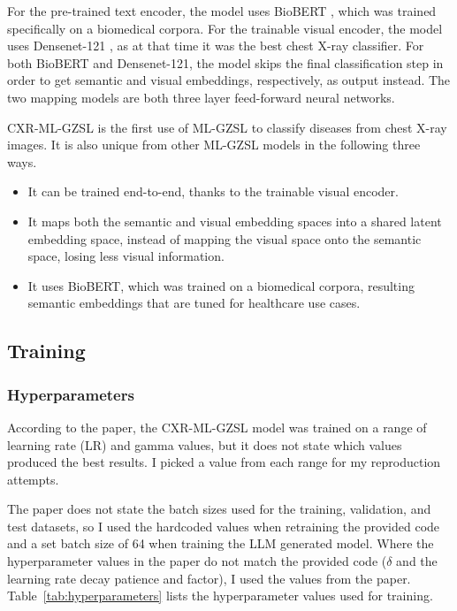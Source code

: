 \documentclass[letterpaper]{article} %
\begin{document}
For the pre-trained text encoder, the model uses BioBERT \cite{10.1093/bioinformatics/btz682}, which was trained specifically on a biomedical corpora. For the trainable visual encoder, the model uses Densenet-121 \cite{rajpurkar2017chexnetradiologistlevelpneumoniadetection}, as at that time it was the best chest X-ray classifier. For both BioBERT and Densenet-121, the model skips the final classification step in order to get semantic and visual embeddings, respectively, as output instead. The two mapping models are both three layer feed-forward neural networks.

CXR-ML-GZSL is the first use of ML-GZSL to classify diseases from chest X-ray images. It is also unique from other ML-GZSL models in the following three ways.

\begin{itemize}
    \item It can be trained end-to-end, thanks to the trainable visual encoder.
    \item It maps both the semantic and visual embedding spaces into a shared latent embedding space, instead of mapping the visual space onto the semantic space, losing less visual information.
    \item It uses BioBERT, which was trained on a biomedical corpora, resulting semantic embeddings that are tuned for healthcare use cases.
\end{itemize}

\subsection{Training}

\subsubsection{Hyperparameters}

According to the paper, the CXR-ML-GZSL model was trained on a range of learning rate (LR) and gamma values, but it does not state which values produced the best results. I picked a value from each range for my reproduction attempts.

The paper does not state the batch sizes used for the training, validation, and test datasets, so I used the hardcoded values when retraining the provided code and a set batch size of 64 when training the LLM generated model. Where the hyperparameter values in the paper do not match the provided code ($\delta$ and the learning rate decay patience and factor), I used the values from the paper. Table~\ref{tab:hyperparameters} lists the hyperparameter values used for training.
\end{document}
